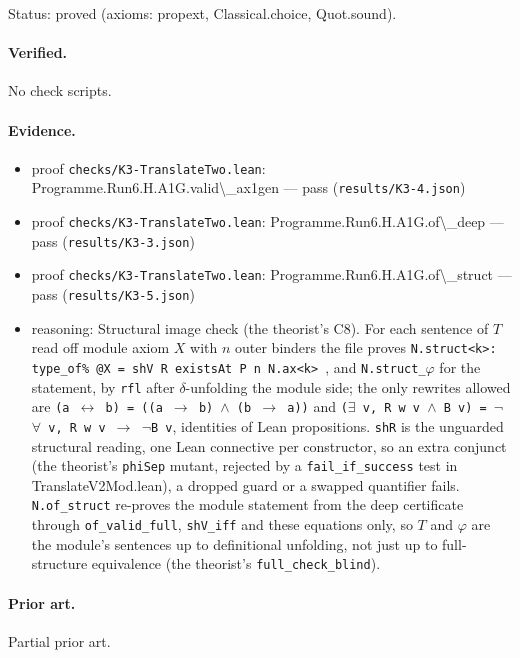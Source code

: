 \documentclass{article}
\begin{document}
Status: proved (axioms: propext, Classical.choice, Quot.sound).

\paragraph{Verified.}
No check scripts.

\paragraph{Evidence.}
\begin{itemize}
\item proof \texttt{checks/K3-TranslateTwo.lean}: Programme.Run6.H.A1G.valid\textbackslash{}\_ax1gen --- pass (\texttt{results/K3-4.json})
\item proof \texttt{checks/K3-TranslateTwo.lean}: Programme.Run6.H.A1G.of\textbackslash{}\_deep --- pass (\texttt{results/K3-3.json})
\item proof \texttt{checks/K3-TranslateTwo.lean}: Programme.Run6.H.A1G.of\textbackslash{}\_struct --- pass (\texttt{results/K3-5.json})
\item reasoning: Structural image check (the theorist's C8). For each sentence of $T$ read off module axiom $X$ with $n$ outer binders the file proves \texttt{N.struct\textless{}k\textgreater{}: type\_of\% @X = shV R existsAt P n N.ax\textless{}k\textgreater{} }, and \texttt{N.struct\_$\varphi$} for the statement, by \texttt{rfl} after $\delta$-unfolding the module side; the only rewrites allowed are \texttt{(a $\leftrightarrow$ b) = ((a $\to$ b) $\wedge$ (b $\to$ a))} and \texttt{($\exists$ v, R w v $\wedge$ B v) = $\neg$$\forall$ v, R w v $\to$ $\neg$B v}, identities of Lean propositions. \texttt{shR} is the unguarded structural reading, one Lean connective per constructor, so an extra conjunct (the theorist's \texttt{phiSep} mutant, rejected by a \texttt{fail\_if\_success} test in TranslateV2Mod.lean), a dropped guard or a swapped quantifier fails. \texttt{N.of\_struct} re-proves the module statement from the deep certificate through \texttt{of\_valid\_full}, \texttt{shV\_iff} and these equations only, so $T$ and $\varphi$ are the module's sentences up to definitional unfolding, not just up to full-structure equivalence (the theorist's \texttt{full\_check\_blind}).
\end{itemize}

\paragraph{Prior art.} Partial prior art.
\end{document}
